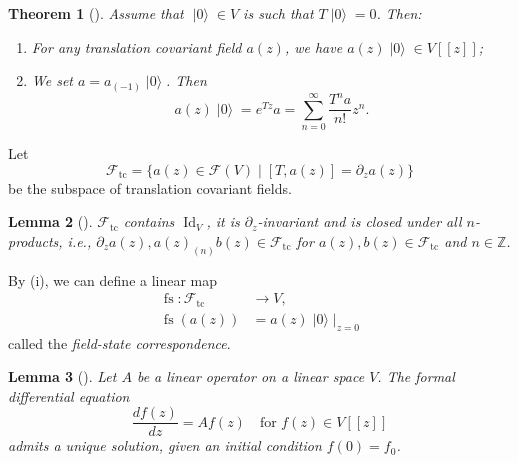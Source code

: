 \documentclass[a4paper, 12pt, reqno]{amsart}
\newtheorem{theorem}{Theorem}[section]
\newtheorem{lemma}[theorem]{Lemma}
\theoremstyle{remark}
\numberwithin{equation}{subsection}
\DeclareMathOperator{\Id}{Id}
\DeclareMathOperator{\vac}{|0\rangle}
\DeclareMathOperator{\fs}{fs}
\DeclareMathOperator{\tc}{tc}
\begin{document}
\begin{theorem}[{\cite[Lemma 1]{callegaro_introduction_2017}}]
  \label{thr:14}
  Assume that $\vac \in V$ is such that $T\vac = 0$.
  Then:
  \begin{enumerate}
  \item For any translation covariant field $a(z)$, we have $a(z)\vac \in V[[z]]$;
  \item We set $a = a_{(-1)}\vac$.
    Then
    \begin{equation*}
      a(z)\vac = e^{Tz}a = \sum_{n = 0}^{\infty}\frac{T^na}{n!}z^n.
    \end{equation*}
  \end{enumerate}
\end{theorem}

Let
\begin{equation*}
  \mathcal{F}_{\tc} = \{a(z) \in \mathcal{F}(V) \mid [T, a(z)] = \partial_za(z)\}
\end{equation*}
be the subspace of translation covariant fields.

\begin{lemma}[{\cite[Lemma 3]{callegaro_introduction_2017}}]
  \label{lmm:5}
  $\mathcal{F}_{\tc}$ contains $\Id_V$, it is $\partial_z$-invariant and is closed under all $n$-products, i.e., $\partial_za(z), a(z)_{(n)}b(z) \in \mathcal{F}_{\tc}$ for $a(z), b(z) \in \mathcal{F}_{\tc}$ and $n \in \mathbb{Z}$.
\end{lemma}

By (i), we can define a linear map
\begin{align*}
  \fs: \mathcal{F}_{\tc} &\to V, \\
  \fs(a(z)) &= a(z)\vac|_{z = 0}
\end{align*}
called the \emph{field-state correspondence}.

\begin{lemma}[{\cite[Proposition 4.3.2]{nozaradan_introduction_2008}}]
  \label{lmm:6}
  Let $A$ be a linear operator on a linear space $V$.
  The formal differential equation
  \begin{equation*}
    \frac{df(z)}{dz} = Af(z) \quad \text{for }f(z) \in V[[z]]
  \end{equation*}
  admits a unique solution, given an initial condition $f(0) = f_0$.
\end{lemma}
\end{document}
